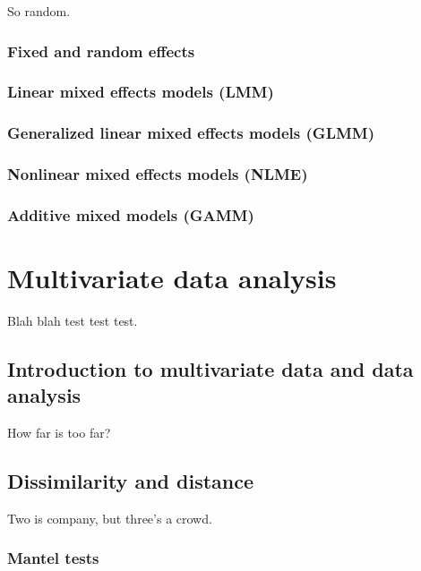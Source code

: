 \documentclass[
  13,
  letterpaper,
]{report}
\begin{document}
So random.

\section{Fixed and random effects}\label{sec-mixed-effects}

\section{Linear mixed effects models (LMM)}\label{sec-mixed-lme}

\section{Generalized linear mixed effects models
(GLMM)}\label{sec-mixed-glmm}

\section{Nonlinear mixed effects models (NLME)}\label{sec-mixed-nlme}

\section{Additive mixed models (GAMM)}\label{sec-mixed-gamm}

\part{Multivariate data analysis}

Blah blah test test test.

\chapter{Introduction to multivariate data and data
analysis}\label{sec-mdata}

How far is too far?

\chapter{Dissimilarity and distance}\label{sec-dist}

Two is company, but three's a crowd.

\section{Mantel tests}\label{mantel-tests}
\end{document}
